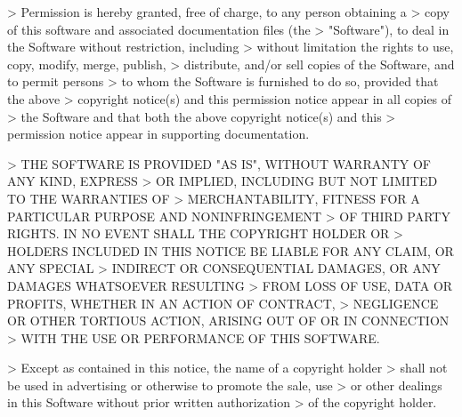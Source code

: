 \begin{DoxyVerb}
> Permission is hereby granted, free of charge, to any person obtaining a
> copy of this software and associated documentation files (the
> "Software"), to deal in the Software without restriction, including
> without limitation the rights to use, copy, modify, merge, publish,
> distribute, and/or sell copies of the Software, and to permit persons
> to whom the Software is furnished to do so, provided that the above
> copyright notice(s) and this permission notice appear in all copies of
> the Software and that both the above copyright notice(s) and this
> permission notice appear in supporting documentation. 

> THE SOFTWARE IS PROVIDED "AS IS", WITHOUT WARRANTY OF ANY KIND, EXPRESS
> OR IMPLIED, INCLUDING BUT NOT LIMITED TO THE WARRANTIES OF
> MERCHANTABILITY, FITNESS FOR A PARTICULAR PURPOSE AND NONINFRINGEMENT
> OF THIRD PARTY RIGHTS. IN NO EVENT SHALL THE COPYRIGHT HOLDER OR
> HOLDERS INCLUDED IN THIS NOTICE BE LIABLE FOR ANY CLAIM, OR ANY SPECIAL
> INDIRECT OR CONSEQUENTIAL DAMAGES, OR ANY DAMAGES WHATSOEVER RESULTING
> FROM LOSS OF USE, DATA OR PROFITS, WHETHER IN AN ACTION OF CONTRACT,
> NEGLIGENCE OR OTHER TORTIOUS ACTION, ARISING OUT OF OR IN CONNECTION
> WITH THE USE OR PERFORMANCE OF THIS SOFTWARE. 

> Except as contained in this notice, the name of a copyright holder
> shall not be used in advertising or otherwise to promote the sale, use
> or other dealings in this Software without prior written authorization
> of the copyright holder.
\end{DoxyVerb}
 